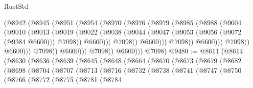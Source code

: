 \begin{lexlean}{RustStd}
\begin{coremodule}
                              (@8942
                                (@8945
                                  (@8951
                                    (@8954
                                      (@8970
                                        (@8976
                                          (@8979
                                            (@8985
                                              (@8988
                                                (@9004
                                                  (@9010
                                                    (@9013
                                                      (@9019
                                                        (@9022
                                                          (@9038
                                                            (@9044
                                                              (@9047
                                                                (@9053
                                                                  (@9056 (@9072 (@9384 @6600)))
                                                                  @7098))
                                                              @6600)))
                                                        @7098))
                                                    @6600)))
                                              @7098))
                                          @6600)))
                                    @7098))
                                @6600)))
                          @7098))
                      @6600)))
                @7098))
            @6600)))
      @7098)
@9480 := @8611
    (@8614
      (@8630
        (@8636
          (@8639
            (@8645
              (@8648
                (@8664
                  (@8670
                    (@8673
                      (@8679
                        (@8682
                          (@8698
                            (@8704
                              (@8707
                                (@8713
                                  (@8716
                                    (@8732
                                      (@8738
                                        (@8741
                                          (@8747
                                            (@8750
                                              (@8766
                                                (@8772
                                                  (@8775
                                                    (@8781
                                                      (@8784

\end{coremodule}
\end{lexlean}

